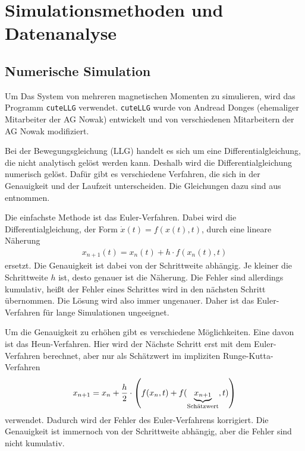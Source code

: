\documentclass[main.tex]{subfiles}
\begin{document}
\newpage
\section{Simulationsmethoden und Datenanalyse}

\subsection{Numerische Simulation}
Um Das System von mehreren magnetischen Momenten zu simulieren, wird das
Programm \texttt{cuteLLG}\cite{cuteLLG} verwendet. \texttt{cuteLLG} wurde von
Andread Donges (ehemaliger Mitarbeiter der AG Nowak) entwickelt und von
verschiedenen Mitarbeitern der AG Nowak modifiziert.



Bei der Bewegungsgleichung (LLG) handelt es sich um eine Differentialgleichung, die nicht analytisch gelöst werden kann.
Deshalb wird die Differentialgleichung numerisch gelöst. Dafür gibt es verschiedene Verfahren, die sich in der Genauigkeit und der Laufzeit unterscheiden. 
Die Gleichungen dazu sind aus \cite{Computerphysik} entnommen.

Die einfachste Methode ist das Euler-Verfahren. Dabei wird die
Differentialgleichung, der Form \(\Dot{x}(t) = f(x(t),t)\), durch eine lineare Näherung 
\begin{align}
    x_{n+1}(t) = x_n(t) + h \cdot f(x_n(t),t)
\end{align}
ersetzt. Die Genauigkeit ist dabei von der Schrittweite abhängig. Je kleiner die Schrittweite \(h\) ist, desto genauer ist die Näherung. 
Die Fehler sind allerdings kumulativ, heißt der Fehler eines Schrittes wird in den nächsten Schritt übernommen. Die Lösung wird also immer ungenauer.
Daher ist das Euler-Verfahren für lange Simulationen ungeeignet.


Um die Genauigkeit zu erhöhen gibt es verschiedene Möglichkeiten. Eine davon ist das Heun-Verfahren. Hier wird der Nächste Schritt erst mit dem Euler-Verfahren berechnet, aber nur als Schätzwert im impliziten Runge-Kutta-Verfahren 
\begin{align}
    x_{n+1} = x_n + \frac{h}{2} \cdot \qty(f(x_n,t) + f(\underbrace{x_{n+1}}_\text{Schätzwert},t))
\end{align}
verwendet. Dadurch wird der Fehler des Euler-Verfahrens korrigiert. Die Genauigkeit ist immernoch von der Schrittweite abhängig, aber die Fehler sind nicht kumulativ.
\end{document}
